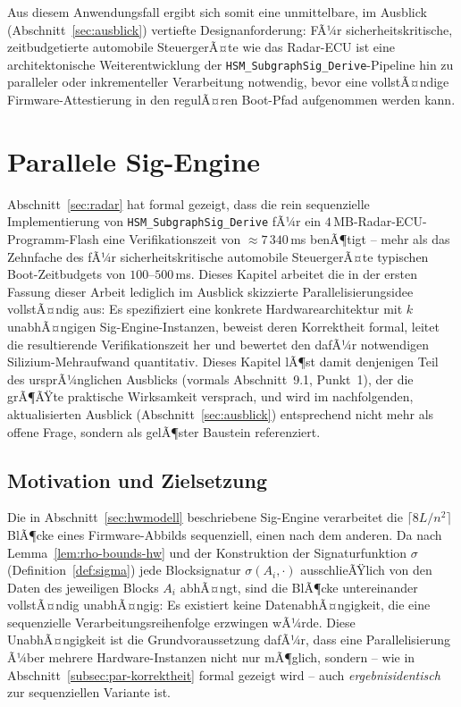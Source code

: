 ﻿\documentclass[a4paper,12pt]{article}
\theoremstyle{definition}
\begin{document}
Aus diesem Anwendungsfall ergibt sich somit eine unmittelbare, im Ausblick (Abschnitt~\ref{sec:ausblick}) vertiefte Designanforderung: FÃ¼r sicherheitskritische, zeitbudgetierte automobile SteuergerÃ¤te wie das Radar-ECU ist eine architektonische Weiterentwicklung der \texttt{HSM\_SubgraphSig\_Derive}-Pipeline hin zu paralleler oder inkrementeller Verarbeitung notwendig, bevor eine vollstÃ¤ndige Firmware-Attestierung in den regulÃ¤ren Boot-Pfad aufgenommen werden kann.

\section{Parallele Sig-Engine}
\label{sec:parallel}

Abschnitt~\ref{sec:radar} hat formal gezeigt, dass die rein sequenzielle Implementierung von \texttt{HSM\_SubgraphSig\_Derive} fÃ¼r ein $4$\,MB-Radar-ECU-Programm-Flash eine Verifikationszeit von $\approx 7\,340$\,ms benÃ¶tigt -- mehr als das Zehnfache des fÃ¼r sicherheitskritische automobile SteuergerÃ¤te typischen Boot-Zeitbudgets von $100$--$500$\,ms. Dieses Kapitel arbeitet die in der ersten Fassung dieser Arbeit lediglich im Ausblick skizzierte Parallelisierungsidee vollstÃ¤ndig aus: Es spezifiziert eine konkrete Hardwarearchitektur mit $k$ unabhÃ¤ngigen Sig-Engine-Instanzen, beweist deren Korrektheit formal, leitet die resultierende Verifikationszeit her und bewertet den dafÃ¼r notwendigen Silizium-Mehraufwand quantitativ. Dieses Kapitel lÃ¶st damit denjenigen Teil des ursprÃ¼nglichen Ausblicks (vormals Abschnitt~9.1, Punkt~1), der die grÃ¶ÃŸte praktische Wirksamkeit versprach, und wird im nachfolgenden, aktualisierten Ausblick (Abschnitt~\ref{sec:ausblick}) entsprechend nicht mehr als offene Frage, sondern als gelÃ¶ster Baustein referenziert.

\subsection{Motivation und Zielsetzung}

Die in Abschnitt~\ref{sec:hwmodell} beschriebene Sig-Engine verarbeitet die $\lceil 8L/n^2\rceil$ BlÃ¶cke eines Firmware-Abbilds sequenziell, einen nach dem anderen. Da nach Lemma~\ref{lem:rho-bounds-hw} und der Konstruktion der Signaturfunktion $\sigma$ (Definition~\ref{def:sigma}) jede Blocksignatur $\sigma(A_i, \cdot)$ ausschlieÃŸlich von den Daten des jeweiligen Blocks $A_i$ abhÃ¤ngt, sind die BlÃ¶cke untereinander vollstÃ¤ndig unabhÃ¤ngig: Es existiert keine DatenabhÃ¤ngigkeit, die eine sequenzielle Verarbeitungsreihenfolge erzwingen wÃ¼rde. Diese UnabhÃ¤ngigkeit ist die Grundvoraussetzung dafÃ¼r, dass eine Parallelisierung Ã¼ber mehrere Hardware-Instanzen nicht nur mÃ¶glich, sondern -- wie in Abschnitt~\ref{subsec:par-korrektheit} formal gezeigt wird -- auch \emph{ergebnisidentisch} zur sequenziellen Variante ist.
\end{document}

